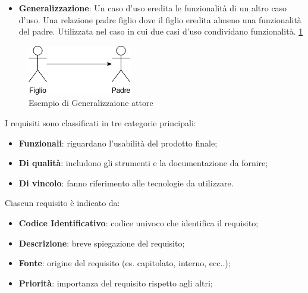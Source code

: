\begin{itemize}
    \begin{itemize}
        \item \textbf{Generalizzazione}: Un caso d'uso eredita le funzionalità di un altro caso d'uso. Una relazione padre figlio dove il figlio eredita almeno una funzionalità del padre. Utilizzata nel caso in cui due casi d'uso condividano funzionalità. \ref{fig:generalizzazione_attore}
    \end{itemize}

    \begin{figure}[H]
        \centering
        \includegraphics{../../img/Generalizzazione_Attori.png}
        \caption{Esempio di Generalizzaione attore}
        \label{fig:generalizzazione_attore}
    \end{figure}

\end{itemize}


I requisiti sono classificati in tre categorie principali:  
\begin{itemize}
    \item \textbf{Funzionali}: riguardano l'usabilità del prodotto finale;  
    \item \textbf{Di qualità}: includono gli strumenti e la documentazione da fornire;  
    \item \textbf{Di vincolo}: fanno riferimento alle tecnologie da utilizzare.
\end{itemize}
Ciascun requisito è indicato da:
\begin{itemize}
    \item \textbf{Codice Identificativo}: codice univoco che identifica il requisito;
    \item \textbf{Descrizione}: breve spiegazione del requisito;
    \item \textbf{Fonte}: origine del requisito (es. capitolato, interno, ecc..);
    \item \textbf{Priorità}: importanza del requisito rispetto agli altri;
\end{itemize} 

